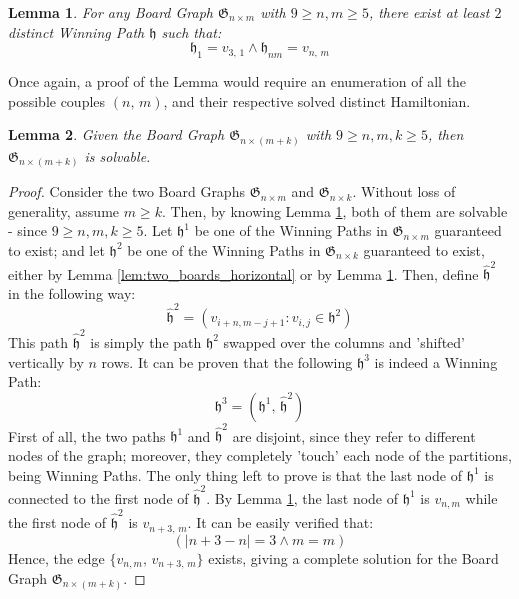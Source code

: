 \documentclass[conference]{IEEEtran}
\newtheorem{lemma}{Lemma}[section]
\begin{document}
\begin{lemma} \label{lem:two_boards_vertical}
    For any Board Graph $\mathfrak{G}_{n \times m}$ with $9 \ge n, m \ge 5$, there exist at least $2$ distinct Winning Path $\mathfrak{h}$ such that:
    $$
        \mathfrak{h}_1 = v_{3,\,1} \land \mathfrak{h}_{nm} = v_{n,\,m} 
    $$
\end{lemma}

Once again, a proof of the Lemma would require an enumeration of all the possible couples $(n,\,m)$, and their respective solved distinct Hamiltonian.
\begin{lemma} \label{lem:tiling_vertical}
    Given the Board Graph $\mathfrak{G}_{n \times (m + k)}$ with $9 \ge n, m, k \ge 5$, then $\mathfrak{G}_{n \times (m + k)}$ is solvable.
\end{lemma}
\begin{proof}
    Consider the two Board Graphs $\mathfrak{G}_{n \times m}$ and $\mathfrak{G}_{n \times k}$.
    Without loss of generality, assume $m \ge k$. Then, by knowing Lemma \ref{lem:two_boards_vertical}, both of them are solvable - since $9 \ge n, m, k \ge 5$.
    Let $\mathfrak{h}^1$ be one of the Winning Paths in $\mathfrak{G}_{n \times m}$ guaranteed to exist;
        and let $\mathfrak{h}^2$ be one of the Winning Paths in $\mathfrak{G}_{n \times k}$ guaranteed to exist, either by Lemma \ref{lem:two_boards_horizontal} or by Lemma \ref{lem:two_boards_vertical}.
    Then, define $\hat{\mathfrak{h}}^2$ in the following way:
    $$
        \hat{\mathfrak{h}}^2 = (v_{i + n, m - j + 1} : v_{i,j} \in \mathfrak{h}^2)
    $$
    This path $\hat{\mathfrak{h}}^2$ is simply the path $\mathfrak{h}^2$ swapped over the columns and 'shifted' vertically by $n$ rows.
        It can be proven that the following $\mathfrak{h}^3$ is indeed a Winning Path:
    $$
        \mathfrak{h}^3 = (\mathfrak{h}^1,\,\hat{\mathfrak{h}}^2)
    $$
    First of all, the two paths $\mathfrak{h}^1$ and $\hat{\mathfrak{h}}^2$ are disjoint, since they refer to different nodes of the graph; moreover, they completely 'touch' each node of the partitions, being Winning Paths.
    The only thing left to prove is that the last node of $\mathfrak{h}^1$ is connected to the first node of $\hat{\mathfrak{h}}^2$.
    By Lemma \ref{lem:two_boards_vertical}, the last node of $\mathfrak{h}^1$ is $v_{n,m}$ while the first node of $\hat{\mathfrak{h}}^2$ is $v_{n+3,\,m}$.
    It can be easily verified that:
    $$
        (|n+3 - n| = 3 \land m = m)
    $$
    Hence, the edge $\{v_{n,m},\,v_{n+3,\,m}\}$ exists, giving a complete solution for the Board Graph $\mathfrak{G}_{n \times (m + k)}$.
\end{proof}
\end{document}

